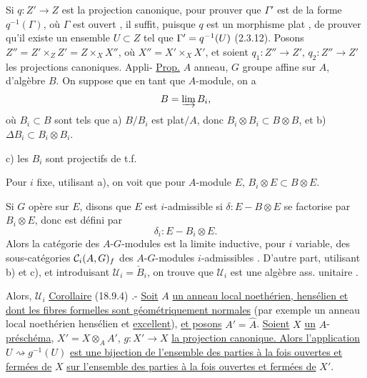 Si $q:Z'\to Z$ est la projection canonique, pour prouver que $\Gamma'$ est de la forme  $q^{-1}(\Gamma)$, où $\Gamma$ est ouvert , il suffit, puisque $q$ est un morphisme  plat , de prouver  qu'il existe un ensemble $U\subset Z$ tel que $\Gamma'=q^{-1}(U)$ (2.3.12). Posons $Z''=Z'\times_Z Z'=Z\times_X X''$, où $X''=X'\times_X X'$, et soient $q_1:Z''\to Z'$, $q_2:Z''\to Z'$ les projections canoniques. Appli-
\uline{Prop.} $A$ anneau, $G$ groupe affine sur $A$, d'algèbre $B$. On suppose que en tant que $A$-module, on a
\[
B=\varinjlim B_i,
\]
où $B_i\subset B$ sont tels que a) $B/B_i$ est plat$/A$,  donc \deleted{$\unsure{\Delta}$} $B_i\otimes B_i\subset B\otimes B$, et b) $\Delta B_i\subset B_i\otimes B_i$.

 c) les $B_i$ sont projectifs de t.f.

 Pour $i$ fixe, utilisant a), on voit que pour  $A$-module $E$, $B_i\otimes E\subset B\otimes E$.

Si $G$ opère sur $E$, disons que $E$ est $i$-admissible si $\delta:E-B\otimes E$ se factorise par $B_i\otimes E$, donc est défini par
\[
\delta_i:E-B_i\otimes E.
\]
Alors la catégorie des $A$-$G$-modules  est la limite inductive, pour $i$ variable, des sous-catégories $\mathcal C_i(A,G)_f$ des $A$-$G$-modules $i$-admissibles . D'autre part, utilisant b) et c), et introduisant $\mathcal U_i=\check B_i$, on trouve que $\mathcal U_i$ est une algèbre ass. unitaire .


Alors,  $\mathcal U_i$
\uline{Corollaire} (18.9.4) .- \uline{Soit} $A$ \uline{un anneau local noethérien, hensélien et dont les fibres formelles sont géométriquement normales}  (par exemple un anneau local noethérien hensélien et \uline{excellent}), \uline{et posons} $A'=\hat A$. \uline{Soient} $X$ \uline{un} $A$-\uline{préschéma}, $X'=X\otimes_A A'$, $g:X'\to X$ \uline{la projection canonique. Alors l'application} $U\rightsquigarrow g^{-1}(U)$ \uline{est une bijection de l'ensemble des parties à la fois ouvertes et fermées de} $X$ \uline{sur l'ensemble des parties à la fois ouvertes et fermées de} $X'$.

